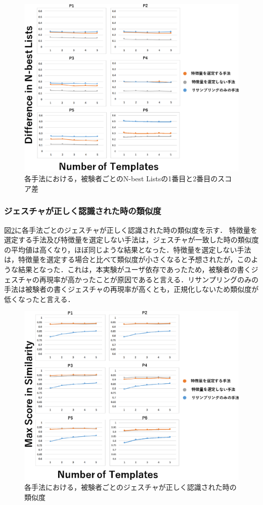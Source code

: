 \begin{figure}[!h]
\centering
\includegraphics[width=1.0\columnwidth]{img/pre_diff.eps}
\caption{各手法における，被験者ごとのN-best Listsの1番目と2番目のスコア差}
\label{fig:rare_diff}
\end{figure}

\subsubsection{ジェスチャが正しく認識された時の類似度}
図\ref{fig:rare_sim}に各手法ごとのジェスチャが正しく認識された時の類似度を示す．
特徴量を選定する手法及び特徴量を選定しない手法は，ジェスチャが一致した時の類似度の平均値は高くなり，ほぼ同じような結果となった．特徴量を選定しない手法は，特徴量を選定する場合と比べて類似度が小さくなると予想されたが，このような結果となった．これは，本実験がユーザ依存であったため，被験者の書くジェスチャの再現率が高かったことが原因であると言える．リサンプリングのみの手法は被験者の書くジェスチャの再現率が高くとも，正規化しないため類似度が低くなったと言える．

\begin{figure}[!h]
\centering
\includegraphics[width=1.0\columnwidth]{img/pre_sim.eps}
\caption{各手法における，被験者ごとのジェスチャが正しく認識された時の類似度}
\label{fig:rare_sim}
\end{figure}

